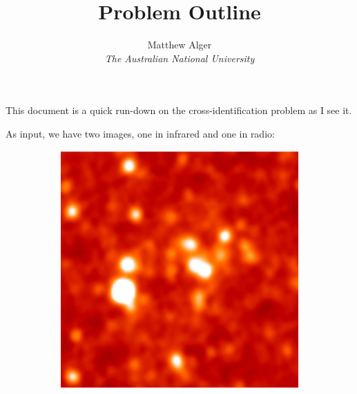 \documentclass[a4paper]{article}
\begin{document}
    \title{Problem Outline}
    \author{Matthew Alger \\ \emph{The Australian National University}}
    \maketitle

    This document is a quick run-down on the cross-identification problem as I see it.

    As input, we have two images, one in infrared and one in radio:

    \begin{figure}[!ht]
        \centering
        \begin{subfigure}{0.3\textwidth}
            \includegraphics[width=\linewidth]{../images/ARG000180p_ir.jpg}
        \end{subfigure}\quad
        \begin{subfigure}{0.3\textwidth}

\end{subfigure}
\end{figure}
\end{document}
